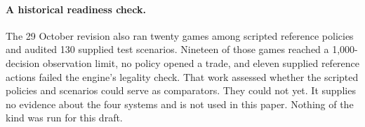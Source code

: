 \paragraph{A historical readiness check.} The 29 October revision also ran twenty games among scripted reference policies and audited 130 supplied test scenarios. Nineteen of those games reached a 1,000-decision observation limit, no policy opened a trade, and eleven supplied reference actions failed the engine's legality check. That work assessed whether the scripted policies and scenarios could serve as comparators. They could not yet. It supplies no evidence about the four systems and is not used in this paper. Nothing of the kind was run for this draft.

